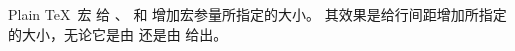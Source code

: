 \documentclass{book}
\begin{document}
Plain \TeX\ 宏  给 、
和  增加宏参量所指定的大小。
其效果是给行间距增加所指定的大小，无论它是由 
还是由  给出。


\endofchapter
\end{document}
